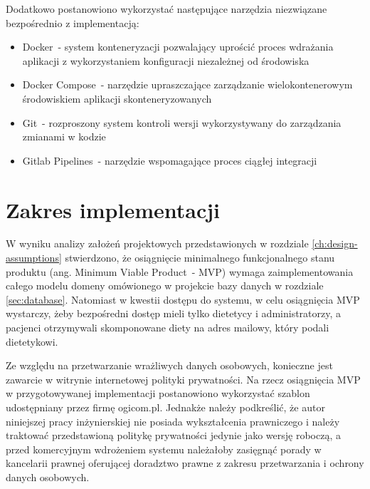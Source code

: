 \par
Dodatkowo postanowiono wykorzystać następujące narzędzia niezwiązane bezpośrednio z implementacją:
\begin{itemize}
    \item Docker\cite{tech:docker}~- system konteneryzacji pozwalający uprościć proces wdrażania aplikacji z wykorzystaniem konfiguracji niezależnej od środowiska
    \item Docker Compose\cite{tech:docker-compose}~- narzędzie upraszczające zarządzanie wielokontenerowym środowiskiem aplikacji skonteneryzowanych
    \item Git\cite{tech:git}~- rozproszony system kontroli wersji wykorzystywany do zarządzania zmianami w kodzie
    \item Gitlab Pipelines\cite{tech:gitlab-pipelines}~- narzędzie wspomagające proces ciągłej integracji
\end{itemize}

\section{Zakres implementacji}\label{sec:implementation-scope}

W wyniku analizy założeń projektowych przedstawionych w rozdziale \ref{ch:design-assumptions} stwierdzono,
że osiągnięcie minimalnego funkcjonalnego stanu produktu (ang. Minimum Viable Product~- MVP)
wymaga zaimplementowania całego modelu domeny omówionego w projekcie bazy danych w rozdziale \ref{sec:database}.
Natomiast w kwestii dostępu do systemu, w celu osiągnięcia MVP wystarczy, żeby bezpośredni dostęp mieli tylko dietetycy i administratorzy,
a pacjenci otrzymywali skomponowane diety na adres mailowy, który podali dietetykowi.

\par
Ze względu na przetwarzanie wrażliwych danych osobowych, konieczne jest zawarcie w witrynie internetowej polityki prywatności.
Na rzecz osiągnięcia MVP w przygotowywanej implementacji postanowiono wykorzystać szablon udostępniany przez firmę ogicom.pl\cite{url:ogicom-privacy-policy}.
Jednakże należy podkreślić, że autor niniejszej pracy inżynierskiej nie posiada wykształcenia prawniczego
i należy traktować przedstawioną politykę prywatności jedynie jako wersję roboczą,
a przed komercyjnym wdrożeniem systemu należałoby zasięgnąć porady w kancelarii prawnej oferującej doradztwo prawne z zakresu przetwarzania i ochrony danych osobowych.

